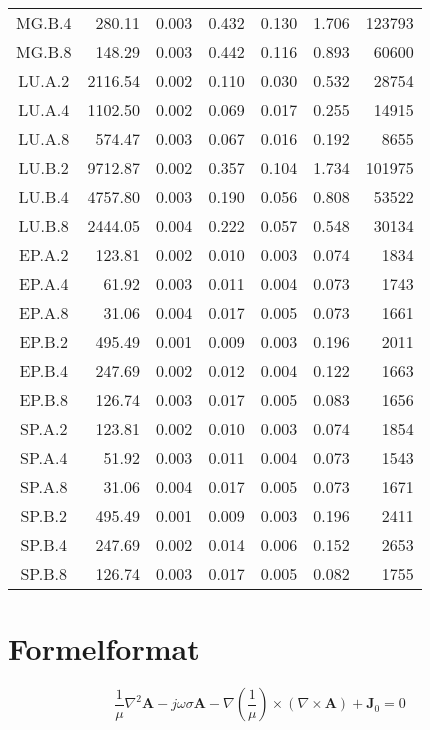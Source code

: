 \begin{ThreePartTable}
\begin{longtable}[c]{c*{6}{r}}
    MG.B.4 & 280.11 & 0.003 & 0.432 & 0.130 & 1.706 & 123793 \\
    MG.B.8 & 148.29 & 0.003 & 0.442 & 0.116 & 0.893 & 60600 \\
    LU.A.2 & 2116.54 & 0.002 & 0.110 & 0.030 & 0.532 & 28754 \\
    LU.A.4 & 1102.50 & 0.002 & 0.069 & 0.017 & 0.255 & 14915 \\
    LU.A.8 & 574.47 & 0.003 & 0.067 & 0.016 & 0.192 & 8655 \\
    LU.B.2 & 9712.87 & 0.002 & 0.357 & 0.104 & 1.734 & 101975 \\
    LU.B.4 & 4757.80 & 0.003 & 0.190 & 0.056 & 0.808 & 53522 \\
    LU.B.8 & 2444.05 & 0.004 & 0.222 & 0.057 & 0.548 & 30134 \\
    EP.A.2 & 123.81 & 0.002 & 0.010 & 0.003 & 0.074 & 1834 \\
    EP.A.4 & 61.92 & 0.003 & 0.011 & 0.004 & 0.073 & 1743 \\
    EP.A.8 & 31.06 & 0.004 & 0.017 & 0.005 & 0.073 & 1661 \\
    EP.B.2 & 495.49 & 0.001 & 0.009 & 0.003 & 0.196 & 2011 \\
    EP.B.4 & 247.69 & 0.002 & 0.012 & 0.004 & 0.122 & 1663 \\
    EP.B.8 & 126.74 & 0.003 & 0.017 & 0.005 & 0.083 & 1656 \\
    SP.A.2 & 123.81 & 0.002 & 0.010 & 0.003 & 0.074 & 1854 \\
    SP.A.4 & 51.92 & 0.003 & 0.011 & 0.004 & 0.073 & 1543 \\
    SP.A.8 & 31.06 & 0.004 & 0.017 & 0.005 & 0.073 & 1671 \\
    SP.B.2 & 495.49 & 0.001 & 0.009 & 0.003 & 0.196 & 2411 \\
    SP.B.4 \tnote{a} & 247.69 & 0.002 & 0.014 & 0.006 & 0.152 & 2653 \\
    SP.B.8 \tnote{b} & 126.74 & 0.003 & 0.017 & 0.005 & 0.082 & 1755 \\
    \bottomrule
  \end{longtable}
\end{ThreePartTable}

\section{Formelformat}

\begin{equation}\label{eq:example}
  \frac{1}{\mu}\nabla^2\mathbf{A}-j\omega\sigma\mathbf{A}
  -\nabla\left(\frac{1}{\mu}\right)\times(\nabla\times\mathbf{A})
  +\mathbf{J}_0=0
\end{equation}

